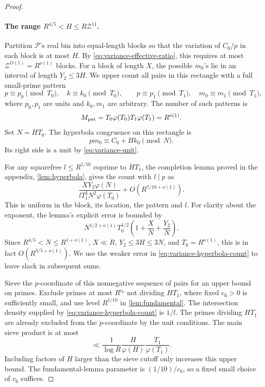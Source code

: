 \begin{proof}
\paragraph{The range \(R^{4/5}<H\le R\mathcal Z^{11}\).}
Partition \(\mathcal P\)'s real bin into equal-length blocks so that
the variation of \(C_0/p\) in each block is at most \(H\).
By \eqref{eq:variance-effective-ratio}, this requires at most
\(\mathcal Z^{O(1)}=R^{o(1)}\) blocks.
For a block of length \(X\), the possible \(m_0\)'s lie in an interval
of length \(Y_2\le3H\). We upper count all pairs in this rectangle with
a full small-prime pattern
\begin{equation}\label{eq:variance-full-pattern}
 p\equiv p_0\pmod{T_0},\quad k\equiv k_0\pmod{T_0},
 \qquad
 p\equiv p_1\pmod{T_1},\quad m_0\equiv m_1\pmod{T_1},
\end{equation}
where \(p_0,p_1\) are units and \(k_0,m_1\) are arbitrary.
The number of such patterns is
\begin{equation}\label{eq:variance-pattern-count}
 M_{\rm pat}=T_0\varphi(T_0)T_1\varphi(T_1)=R^{o(1)}.
\end{equation}
Set \(N=HT_0\). The hyperbola congruence on this rectangle is
\[
 pm_0\equiv C_0+Hk_0\pmod N.
\]
Its right side is a unit by \eqref{eq:variance-unit}.

For any squarefree \(l\le R^{1/10}\) coprime to \(HT_1\), the completion
lemma proved in the appendix, \cref{lem:hyperbola}, gives the count with
\(l\mid p\) as
\begin{equation}\label{eq:variance-hyperbola-count}
 \frac{XY_2\varphi(N)}
 {lT_1^2N^2\varphi(T_0)}
 +O(R^{7/10+o(1)}).
\end{equation}
This is uniform in the block, its location, the pattern and \(l\).
For clarity about the exponent, the lemma's explicit error is bounded by
\[
 N^{1/2+o(1)}T_0^{1/2}
 \left(1+\frac XN+\frac{Y_2}N\right).
\]
Since \(R^{4/5}<N\le R^{1+o(1)}\), \(X\ll R\),
\(Y_2\le3H\le3N\), and \(T_0=R^{o(1)}\), this is in fact
\(O(R^{3/5+o(1)})\). We use the weaker error in
\eqref{eq:variance-hyperbola-count} to leave slack in subsequent sums.

Sieve the \(p\)-coordinate of this nonnegative sequence of pairs for an
upper bound on primes. Exclude primes at most \(R^{c_6}\) not dividing
\(HT_1\), where fixed \(c_6>0\) is sufficiently small, and use level
\(R^{1/10}\) in \cref{lem:fundamental}.
The intersection density supplied by
\eqref{eq:variance-hyperbola-count} is \(1/l\).
The primes dividing \(HT_1\) are already excluded from the \(p\)-coordinate
by the unit conditions. The main sieve product is at most
\begin{equation}\label{eq:variance-large-sieve-product}
 \ll\frac1{\log R}\frac H{\varphi(H)}\frac{T_1}{\varphi(T_1)}.
\end{equation}
Including factors of \(H\) larger than the sieve cutoff only increases
this upper bound.
The fundamental-lemma parameter is \((1/10)/c_6\), so a fixed small
choice of \(c_6\) suffices.


\end{proof}
